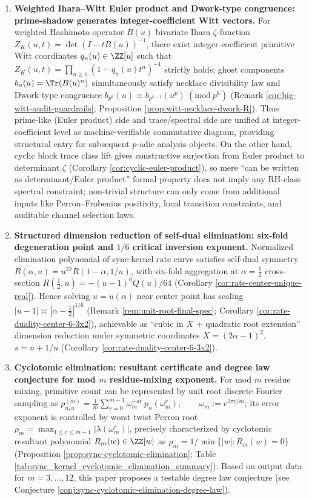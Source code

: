 \begin{enumerate}
  \item \textbf{Weighted Ihara--Witt Euler product and Dwork-type congruence: prime-shadow generates integer-coefficient Witt vectors.}
  For weighted Hashimoto operator \(B(u)\) bivariate Ihara \(\zeta\)-function \(Z_K(u,t)=\det(I-tB(u))^{-1}\), there exist integer-coefficient primitive Witt coordinates \(q_n(u)\in\ZZ[u]\) such that
  \(
  Z_K(u,t)=\prod_{n\ge 1}(1-q_n(u)t^n)^{-1}
  \)
  strictly holds; ghost components \(b_n(u)=\Tr(B(u)^n)\) simultaneously satisfy necklace divisibility law and Dwork-type congruence
  \(b_{p^k}(u)\equiv b_{p^{k-1}}(u^p)\ (\mathrm{mod}\ p^k)\)
  (Remark \ref{cor:big-witt-audit-guardrails}; Proposition \ref{prop:witt-necklace-dwork-R}).
  Thus prime-like (Euler product) side and trace/spectral side are unified at integer-coefficient level as machine-verifiable commutative diagram, providing structural entry for subsequent \(p\)-adic analysis objects.
  On the other hand, cyclic block trace class lift gives constructive surjection from Euler product to determinant \(\zeta\) (Corollary \ref{cor:cyclic-euler-product}), so mere ``can be written as determinant/Euler product'' formal property does not imply any RH-class spectral constraint; non-trivial structure can only come from additional inputs like Perron--Frobenius positivity, local transition constraints, and auditable channel selection laws.

  \item \textbf{Structured dimension reduction of self-dual elimination: six-fold degeneration point and \texorpdfstring{$1/6$}{1/6} critical inversion exponent.}
  Normalized elimination polynomial of sync-kernel rate curve satisfies self-dual symmetry \(R(\alpha,u)=u^{22}R(1-\alpha,1/u)\), with six-fold aggregation at \(\alpha=\tfrac12\) cross-section
  \(R(\tfrac12,u)=-(u-1)^6Q(u)/64\) (Corollary \ref{cor:rate-center-unique-real}).
  Hence solving \(u=u(\alpha)\) near center point has scaling
  \(
  |u-1|\asymp|\alpha-\tfrac12|^{1/6}
  \)
  (Remark \ref{rem:unit-root-final-spec}; Corollary \ref{cor:rate-duality-center-6-3x2}), achievable as ``cubic in \(X\) + quadratic root extension'' dimension reduction under symmetric coordinates \(X=(2\alpha-1)^2\), \(s=u+1/u\) (Corollary \ref{cor:rate-duality-center-6-3x2}).

  \item \textbf{Cyclotomic elimination: resultant certificate and degree law conjecture for mod \texorpdfstring{$m$}{m} residue-mixing exponent.}
  For mod \(m\) residue mixing, primitive count can be represented by unit root discrete Fourier sampling as
  \(
  p_{n,a}^{(m)}=\frac1m\sum_{r=0}^{m-1}\omega_m^{-ar}\,p_n(\omega_m^r),\qquad \omega_m:=e^{2\pi i/m}
  \);
  its error exponent is controlled by worst twist Perron root \(\rho_m=\max_{1\le r\le m-1}|\lambda(\omega_m^r)|\), precisely characterized by cyclotomic resultant polynomial \(R_m(w)\in\ZZ[w]\) as
  \(
  \rho_m=1/\min\{|w|:R_m(w)=0\}
  \)
  (Proposition \ref{prop:sync-cyclotomic-elimination}; Table \ref{tab:sync_kernel_cyclotomic_elimination_summary}).
  Based on output data for \(m=3,\dots,12\), this paper proposes a testable degree law conjecture (see Conjecture \ref{conj:sync-cyclotomic-elimination-degree-law}).


\end{enumerate}
